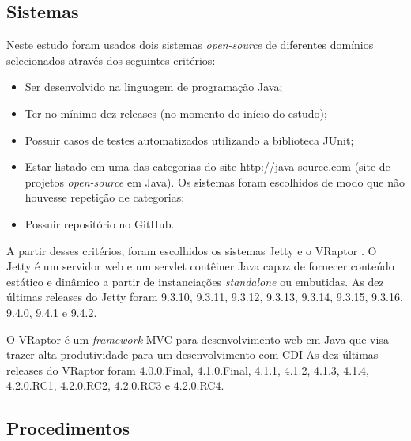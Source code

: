
\subsection{Sistemas} \label{subsec:avaliacao-sistemas}

Neste estudo foram usados dois sistemas \textit{open-source} de diferentes domínios selecionados através dos seguintes critérios:
\begin{itemize}
  \item Ser desenvolvido na linguagem de programação Java;
  \item Ter no mínimo dez releases (no momento do início do estudo);
  \item Possuir casos de testes automatizados utilizando a biblioteca JUnit;
  \item Estar listado em uma das categorias do site \href{http://java-source.com}{http://java-source.com} (site de projetos \textit{open-source} em Java). Os sistemas foram escolhidos de modo que não houvesse repetição de categorias;
  \item Possuir repositório no GitHub.
\end{itemize}

A partir desses critérios, foram escolhidos os sistemas Jetty \cite{Jetty2016} e o VRaptor \cite{VRaptor2017}. O Jetty é um servidor web e um servlet contêiner Java capaz de fornecer conteúdo estático e dinâmico a partir de instanciações \textit{standalone} ou embutidas. As dez últimas releases do Jetty foram 9.3.10, 9.3.11, 9.3.12, 9.3.13, 9.3.14, 9.3.15, 9.3.16, 9.4.0, 9.4.1 e 9.4.2.

O VRaptor é um \textit{framework} MVC para desenvolvimento web em Java que visa trazer alta produtividade para um desenvolvimento com CDI  As dez últimas releases do VRaptor foram 4.0.0.Final, 4.1.0.Final, 4.1.1, 4.1.2, 4.1.3, 4.1.4, 4.2.0.RC1, 4.2.0.RC2, 4.2.0.RC3 e 4.2.0.RC4.

\subsection{Procedimentos} \label{subsec:avaliacao-procedimentos}

